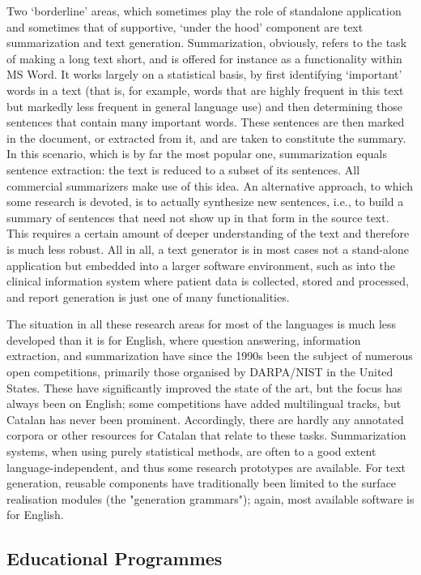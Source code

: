 \begin{multicols}{2}
Two ‘borderline’ areas, which sometimes play the role of standalone application and sometimes that of supportive, ‘under the hood’ component are text summarization and text generation. Summarization, obviously, refers to the task of making a long text short, and is offered for instance as a functionality within MS Word. It works largely on a statistical basis, by first identifying ‘important’ words in a text (that is, for example, words that are highly frequent in this text but markedly less frequent in general language use) and then determining those sentences that contain many important words. These sentences are then marked in the document, or extracted from it, and are taken to constitute the summary. In this scenario, which is by far the most popular one, summarization equals sentence extraction: the text is reduced to a subset of its sentences. All commercial summarizers make use of this idea. An alternative approach, to which some research is devoted, is to actually synthesize new sentences, i.e., to build a summary of sentences that need not show up in that form in the source text. This requires a certain amount of deeper understanding of the text and therefore is much less robust. All in all, a text generator is in most cases not a stand-alone application but embedded into a larger software environment, such as into the clinical information system where patient data is collected, stored and processed, and report generation is just one of many functionalities.

The situation in all these research areas for most of the languages is much less developed than it is for English, where question answering, information extraction, and summarization have since the 1990s been the subject of numerous open competitions, primarily those organised by DARPA/NIST in the United States. These have significantly improved the state of the art, but the focus has always been on English; some competitions have added multilingual tracks, but Catalan has never been prominent. Accordingly, there are hardly any annotated corpora or other resources for Catalan that relate to these tasks. Summarization systems, when using purely statistical methods, are often to a good extent language-independent, and thus some research prototypes are available. For text generation, reusable components have traditionally been limited to the surface realisation modules (the "generation grammars"); again, most available software is for English.

\subsection{Educational Programmes}


\end{multicols}
